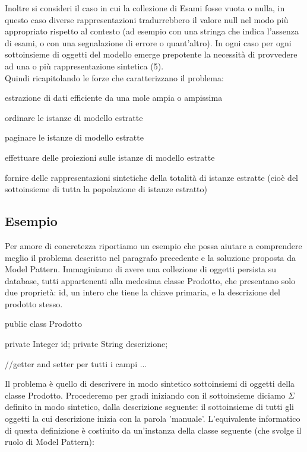 Inoltre si consideri il caso in cui la collezione di Esami fosse vuota o nulla, in questo caso diverse rappresentazioni tradurrebbero il valore null nel modo più appropriato rispetto al contesto (ad esempio con una stringa che indica l'assenza di esami, o con una segnalazione di errore o quant'altro).  In ogni caso per ogni sottoinsieme di oggetti del modello emerge prepotente la necessità di provvedere ad una o più rappresentazione sintetica (5).\\
Quindi ricapitolando le forze che caratterizzano il problema:

\begin{enumerate*}
  \item estrazione di dati efficiente da una mole ampia o ampissima
  \item ordinare  le istanze di modello estratte
  \item paginare  le istanze di modello estratte
  \item effettuare delle proiezioni sulle istanze di modello estratte
  \item fornire delle rappresentazioni sintetiche della totalità di istanze estratte (cioè del sottoinsieme di tutta la popolazione di istanze estratto)
\end{enumerate*}

\subsection{Esempio}
Per amore di concretezza riportiamo un esempio che possa aiutare a comprendere meglio il problema descritto nel paragrafo precedente e la soluzione proposta da Model Pattern. Immaginiamo di avere una collezione di oggetti persista su database, tutti appartenenti alla medesima classe Prodotto, che presentano solo due proprietà: id, un intero che tiene la chiave primaria, e la descrizione del prodotto stesso. 

\begin{java}
public class Prodotto {
    
    private Integer id;
    private String descrizione;

    //getter and setter per tutti i campi
    ...
}
\end{java}

Il problema è quello di descrivere in modo sintetico sottoinsiemi di oggetti della classe Prodotto. Procederemo per gradi iniziando con il sottoinsieme diciamo $\Sigma$ definito in modo sintetico, dalla descrizione seguente: il sottoinsieme di tutti gli oggetti la cui descrizione inizia con la parola 'manuale'. L'equivalente informatico di questa definizione è costiuito da un'instanza della classe seguente (che svolge il ruolo di Model Pattern):


